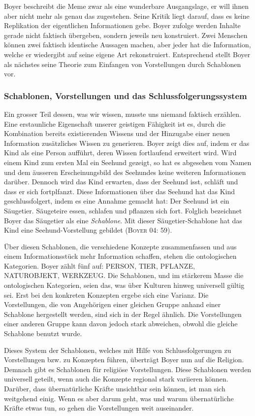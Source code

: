 Boyer beschreibt die Meme zwar als eine wunderbare Ausgangslage, er will ihnen aber nicht mehr als genau das zugestehen. Seine Kritik liegt darauf, dass es keine Replikation der eigentlichen Informationen gebe. Boyer zufolge werden Inhalte gerade nicht faktisch übergeben, sondern jeweils neu konstruiert. Zwei Menschen können zwei faktisch identische Aussagen machen, aber jeder hat die Information, welche er wiedergibt auf seine eigene Art rekonstruiert. Entsprechend stellt Boyer als nächstes seine Theorie zum Einfangen von Vorstellungen durch Schablonen vor.

\subsubsection{Schablonen, Vorstellungen und das Schlussfolgerungssystem}
Ein grosser Teil dessen, was wir wissen, musste uns niemand faktisch erzählen. Eine erstaunliche Eigenschaft unserer geistigen Fähigkeit ist es, durch die Kombination bereits existierenden Wissens und der Hinzugabe einer neuen Information zusätzliches Wissen zu generieren. Boyer zeigt dies auf, indem er das Kind als eine Person aufführt, deren Wissen fortlaufend erweitert wird. Wird einem Kind zum ersten Mal ein Seehund gezeigt, so hat es abgesehen vom Namen und dem äusseren Erscheinungsbild des Seehundes keine weiteren Informationen darüber. Dennoch wird das Kind erwarten, dass der Seehund isst, schläft und dass er sich fortplfanzt. Diese Informationen über das Seehund hat das Kind geschlussfolgert, indem es eine Annahme gemacht hat: Der Seehund ist ein Säugetier. Säugeteire essen, schlafen und pflanzen sich fort. Folglich bezeichnet Boyer das Säugetier als eine \emph{Schablone}. Mit dieser Säugetier-Schablone hat das Kind eine Seehund-Vorstellung gebildet (\textsc{Boyer 04: 59}). 

Über diesen Schablonen, die verschiedene Konzepte zusammenfassen und aus einem Informationsstück mehr Information schaffen, stehen die ontologischen Kategorien. Boyer zählt fünf auf: PERSON, TIER, PFLANZE, NATUROBJEKT, WERKZEUG. Die Schablonen, und im stärkerem Masse die ontologischen Kategorien, seien das, was über Kulturen hinweg universell gültig sei. Erst bei den konkreten Konzepten ergebe sich eine Varianz. Die Vorstellungen, die von Angehörigen einer gleichen Gruppe anhand einer Schablone hergestellt werden, sind sich in der Regel ähnlich. Die Vorstellungen einer anderen Gruppe kann davon jedoch stark abweichen, obwohl die gleiche Schablone benutzt wurde. 

Dieses System der Schablonen, welches mit Hilfe von Schlussfolgerungen zu Vorstellungen bzw. zu Konzepten führen, überträgt Boyer nun auf die Religion. Demnach gibt es Schablonen für religiöse Vorstellungen. Diese Schablonen werden universell geteilt, wenn auch die Konzepte regional stark variieren können. Darüber, dass übernatürliche Kräfte unsichtbar sein können, ist man sich weitgehend einig. Wenn es aber darum geht, was und warum übernatürliche Kräfte etwas tun, so gehen die Vorstellungen weit auseinander. 

